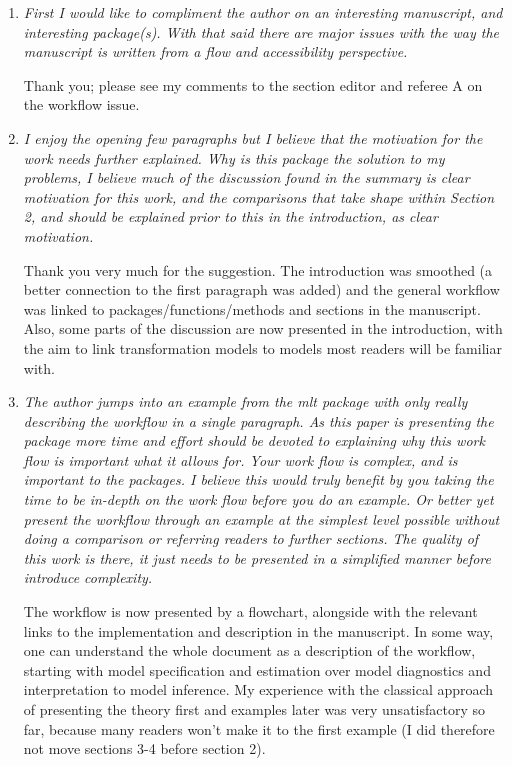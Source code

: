 \documentclass[12pt]{article}
\begin{document}
\begin{enumerate}

\item \textit{First I would like to compliment the author on an interesting
manuscript, and interesting package(s).  With that said there are major
issues with the way the manuscript is written from a flow and accessibility
perspective.  }

Thank you; please see my comments to the section editor and referee A on
the workflow issue.

\item \textit{I enjoy the opening few paragraphs but I believe that the
motivation for the work needs further explained.  Why is this package the
solution to my problems, I believe much of the discussion found in the
summary is clear motivation for this work, and the comparisons that take
shape within Section 2, and should be explained prior to this in the
introduction, as clear motivation.  }

Thank you very much for the suggestion. The introduction was smoothed (a
better connection to the first paragraph was added) and the general workflow
was linked to packages/functions/methods and sections in the manuscript.
Also, some parts of the discussion are now presented in the introduction,
with the aim to link transformation models to models most readers will be
familiar with.

\item \textit{The author jumps into an example from the mlt package with
only really describing the workflow in a single paragraph.  As this paper is
presenting the package more time and effort should be devoted to explaining
why this work flow is important what it allows for.  Your work flow is
complex,  and  is important to the packages.  I believe this would truly
benefit by you taking the time to be in-depth on the work flow before you do
an example.  Or better yet present the workflow through an example at the
simplest level possible without doing a comparison or referring readers to
further sections.  The quality of this work is there, it just needs to be
presented in a simplified manner before introduce complexity.  }

The workflow is now presented by a flowchart, alongside with the relevant
links to the implementation and description in the manuscript. In some way,
one can understand the whole document as a description of the workflow,
starting with model specification and estimation over model diagnostics and
interpretation to model inference. My experience with the classical approach 
of presenting the theory first and examples later was very unsatisfactory so
far, because many readers won't make it to the first example (I did
therefore not move sections 3-4 before section 2).


\end{enumerate}
\end{document}
